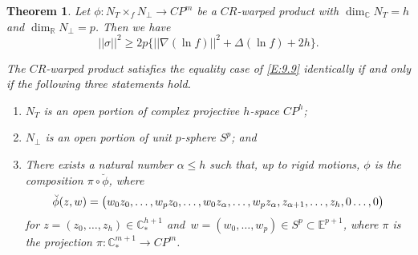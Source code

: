 \documentclass{amsart}
\theoremstyle{plain}
\newtheorem{theorem}{Theorem}[section]
\numberwithin{equation}{section}
\theoremstyle{remark}
\numberwithin{equation}{section}
\begin{document}
 \begin{theorem} \label{T:11.3}   Let $\phi:N_T\times_{f} N_\perp\to CP^m$  be a $CR$-warped product  with $\dim_{\mathbb C} N_T=h$ and $\dim_{\mathbb R} N_\perp=p$. Then we have
\begin{equation}\label{E:9.9}||\sigma||^2\geq 2p\big\{||\nabla (\ln f)||^2+\Delta(\ln f)+2h\big\}.\end{equation}

 The $CR$-warped product  satisfies the equality case of \eqref{E:9.9} identically if and only if the following three statements hold.

\begin{enumerate}
\item[(a)]  $N_T$ is an open portion of  complex projective $h$-space $CP^h$;

\item[(b)]   $N_\perp$ is an open portion of  unit $p$-sphere $S^p$; and

\item[(c)]  There exists a natural number $\alpha\leq h$ such that, up to rigid motions,  $\phi$ is the composition $\pi\circ\breve{\phi}$, where 
\begin{equation}\notag \breve{\phi}(z,w)=\big(w_0 z_0,\ldots,w_p
z_0,\ldots,w_0z_\alpha ,\ldots, w_p z_\alpha ,z_{\alpha +1},\ldots,z_h,0\ldots,0\big)\end{equation} for $z=(z_0,\ldots,z_h)\in
{\mathbb C}_*^{h+1}$ and $\,w=(w_0,\ldots,w_p)\in
S^p\subset{\mathbb E}^{p+1}$, where  $\pi$ is the projection $\pi:{\mathbb C}^{m+1}_*\to CP^m$.
\end{enumerate} \end{theorem} 
\end{document}
